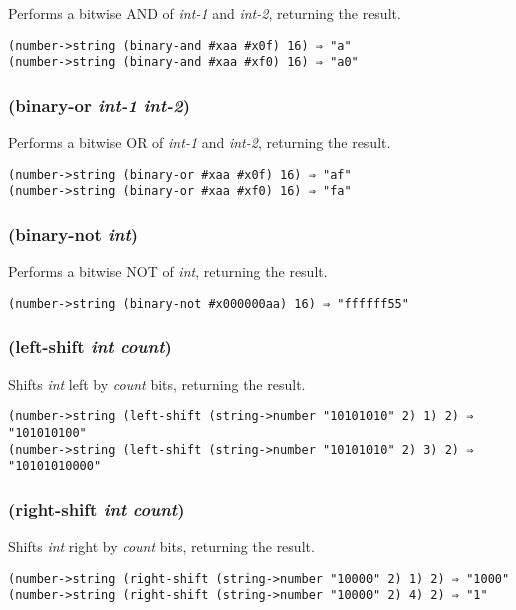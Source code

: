 \documentclass{article}
\begin{document}
Performs a bitwise AND of \emph{int-1} and \emph{int-2}, returning the result.

\begin{verbatim}
(number->string (binary-and #xaa #x0f) 16) ⇒ "a"
(number->string (binary-and #xaa #xf0) 16) ⇒ "a0"
\end{verbatim}

\subsubsection{(binary-or \emph{int-1} \emph{int-2})}

Performs a bitwise OR of \emph{int-1} and \emph{int-2}, returning the result.

\begin{verbatim}
(number->string (binary-or #xaa #x0f) 16) ⇒ "af"
(number->string (binary-or #xaa #xf0) 16) ⇒ "fa"
\end{verbatim}

\subsubsection{(binary-not \emph{int})}

Performs a bitwise NOT of \emph{int}, returning the result.

\begin{verbatim}
(number->string (binary-not #x000000aa) 16) ⇒ "ffffff55"
\end{verbatim}

\subsubsection{(left-shift \emph{int} \emph{count})}

Shifts \emph{int} left by \emph{count} bits, returning the result.

\begin{verbatim}
(number->string (left-shift (string->number "10101010" 2) 1) 2) ⇒ "101010100"
(number->string (left-shift (string->number "10101010" 2) 3) 2) ⇒ "10101010000"
\end{verbatim}

\subsubsection{(right-shift \emph{int} \emph{count})}

Shifts \emph{int} right by \emph{count} bits, returning the result.

\begin{verbatim}
(number->string (right-shift (string->number "10000" 2) 1) 2) ⇒ "1000"
(number->string (right-shift (string->number "10000" 2) 4) 2) ⇒ "1"
\end{verbatim}
\end{document}
